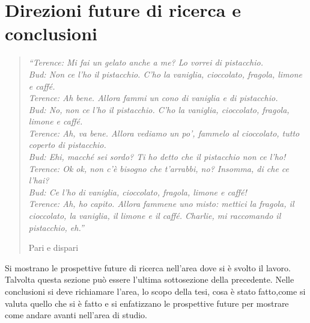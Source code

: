 \chapter{Direzioni future di ricerca e conclusioni}
\label{capitolo7}
\thispagestyle{empty}

\begin{quotation}
{\footnotesize
\noindent\emph{``Terence: Mi fai un gelato anche a me? Lo vorrei di pistacchio. \\
Bud: Non ce l'ho il pistacchio. C'ho la vaniglia, cioccolato, fragola, limone e caff\'e. \\
Terence: Ah bene. Allora fammi un cono di vaniglia e di pistacchio. \\
Bud: No, non ce l'ho il pistacchio. C'ho la vaniglia, cioccolato, fragola, limone e caff\'e. \\
Terence: Ah, va bene. Allora vediamo un po', fammelo al cioccolato, tutto coperto di pistacchio. \\
Bud: Ehi, macché sei sordo? Ti ho detto che il pistacchio non ce l'ho! \\
Terence: Ok ok, non c'è bisogno che t'arrabbi, no? Insomma, di che ce l'hai? \\
Bud: Ce l'ho di vaniglia, cioccolato, fragola, limone e caff\'e! \\
Terence: Ah, ho capito. Allora fammene uno misto: mettici la fragola, il cioccolato, la vaniglia, il limone e il caff\'e. Charlie, mi raccomando il pistacchio, eh.''}
\begin{flushright}
Pari e dispari
\end{flushright}
}
\end{quotation}
\vspace{0.5cm}

\noindent Si mostrano le prospettive future di ricerca nell'area dove si \`e svolto il lavoro. Talvolta questa sezione pu\`o essere l'ultima sottosezione della precedente. Nelle conclusioni si deve richiamare l'area, lo scopo della tesi, cosa \`e stato fatto,come si valuta quello che si \`e fatto e si enfatizzano le prospettive future per mostrare come andare avanti nell'area di studio.